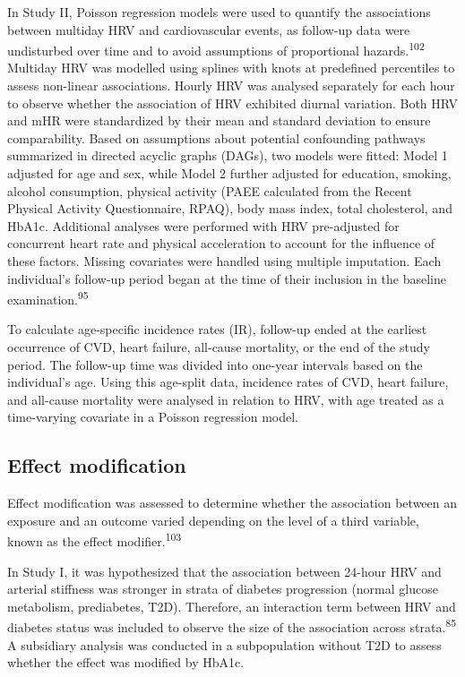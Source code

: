 \documentclass[
  a4paper,
  headsepline=true,
  open=left]{scrbook}
\begin{document}
In Study II, Poisson regression models were used to quantify the
associations between multiday HRV and cardiovascular events, as
follow-up data were undisturbed over time and to avoid assumptions of
proportional hazards.\textsuperscript{102} Multiday HRV was modelled
using splines with knots at predefined percentiles to assess non-linear
associations. Hourly HRV was analysed separately for each hour to
observe whether the association of HRV exhibited diurnal variation. Both
HRV and mHR were standardized by their mean and standard deviation to
ensure comparability. Based on assumptions about potential confounding
pathways summarized in directed acyclic graphs (DAGs), two models were
fitted: Model 1 adjusted for age and sex, while Model 2 further adjusted
for education, smoking, alcohol consumption, physical activity (PAEE
calculated from the Recent Physical Activity Questionnaire, RPAQ), body
mass index, total cholesterol, and HbA1c. Additional analyses were
performed with HRV pre-adjusted for concurrent heart rate and physical
acceleration to account for the influence of these factors. Missing
covariates were handled using multiple imputation. Each individual's
follow-up period began at the time of their inclusion in the baseline
examination.\textsuperscript{95}

To calculate age-specific incidence rates (IR), follow-up ended at the
earliest occurrence of CVD, heart failure, all-cause mortality, or the
end of the study period. The follow-up time was divided into one-year
intervals based on the individual's age. Using this age-split data,
incidence rates of CVD, heart failure, and all-cause mortality were
analysed in relation to HRV, with age treated as a time-varying
covariate in a Poisson regression model.

\hypertarget{effect-modification}{%
\subsection{Effect modification}\label{effect-modification}}

Effect modification was assessed to determine whether the association
between an exposure and an outcome varied depending on the level of a
third variable, known as the effect modifier.\textsuperscript{103}

In Study I, it was hypothesized that the association between 24-hour HRV
and arterial stiffness was stronger in strata of diabetes progression
(normal glucose metabolism, prediabetes, T2D). Therefore, an interaction
term between HRV and diabetes status was included to observe the size of
the association across strata.\textsuperscript{85} A subsidiary analysis
was conducted in a subpopulation without T2D to assess whether the
effect was modified by HbA1c.
\end{document}
